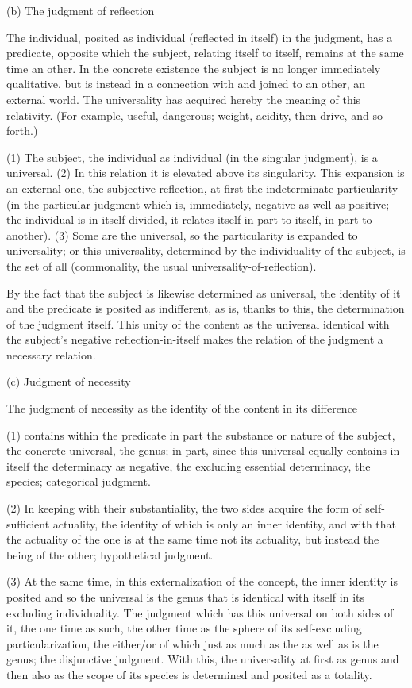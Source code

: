 (b) The judgment of reflection

The individual, posited as individual
(reflected in itself) in the judgment,
has a predicate, opposite which the subject,
relating itself to itself,
remains at the same time an other.
In the concrete existence the subject is
no longer immediately qualitative,
but is instead in a connection with
and joined to an other, an external world.
The universality has acquired hereby
the meaning of this relativity.
(For example, useful, dangerous;
weight, acidity, then drive, and so forth.)

(1) The subject, the individual as individual
(in the singular judgment), is a universal.
(2) In this relation it is elevated above its singularity.
This expansion is an external one, the subjective reflection,
at first the indeterminate particularity
(in the particular judgment
which is, immediately, negative as well as positive;
the individual is in itself divided,
it relates itself in part to itself,
in part to another).
(3) Some are the universal,
so the particularity is expanded to universality;
or this universality, determined by the individuality of the subject,
is the set of all (commonality, the usual universality-of-reflection).

By the fact that the subject is likewise determined as universal,
the identity of it and the predicate is posited as indifferent,
as is, thanks to this, the determination of the judgment itself.
This unity of the content as the universal identical
with the subject's negative reflection-in-itself makes
the relation of the judgment a necessary relation.

(c) Judgment of necessity

The judgment of necessity as
the identity of the content in its difference

(1) contains within the predicate
in part the substance or nature of the subject,
the concrete universal, the genus;
in part, since this universal equally contains
in itself the determinacy as negative,
the excluding essential determinacy, the species;
categorical judgment.

(2) In keeping with their substantiality,
the two sides acquire the form of self-sufficient actuality,
the identity of which is only an inner identity,
and with that the actuality of the one is
at the same time not its actuality,
but instead the being of the other;
hypothetical judgment.

(3) At the same time,
in this externalization of the concept,
the inner identity is posited
and so the universal is the genus
that is identical with itself
in its excluding individuality.
The judgment which has this universal
on both sides of it,
the one time as such,
the other time as the sphere
of its self-excluding particularization,
the either/or of which just as much
as the as well as is the genus;
the disjunctive judgment.
With this, the universality at first as genus
and then also as the scope of its species is
determined and posited as a totality.

